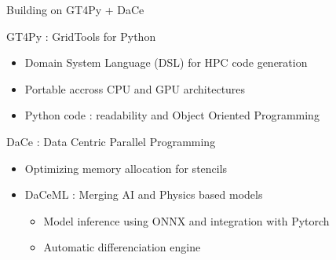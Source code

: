 \documentclass{beamer}
\begin{document}
\begin{frame}{Building on GT4Py + DaCe}

\begin{block}{GT4Py : GridTools for Python}
    \begin{itemize}
        \item \small Domain System Language (DSL) for HPC code generation
        \item \small Portable accross CPU and GPU architectures
        \item[\faPython] \small Python code : readability and Object Oriented Programming
    \end{itemize}    
\end{block}

\begin{block}{DaCe : Data Centric Parallel Programming}
    \begin{itemize}
        \item \small Optimizing memory allocation for stencils
        \item \small DaCeML : Merging AI and Physics based models
        \begin{itemize}
            \item \small Model inference using ONNX and integration with Pytorch
            \item \small Automatic differenciation engine
        \end{itemize}
    \end{itemize}
\end{block}
\end{frame}


\end{document}
